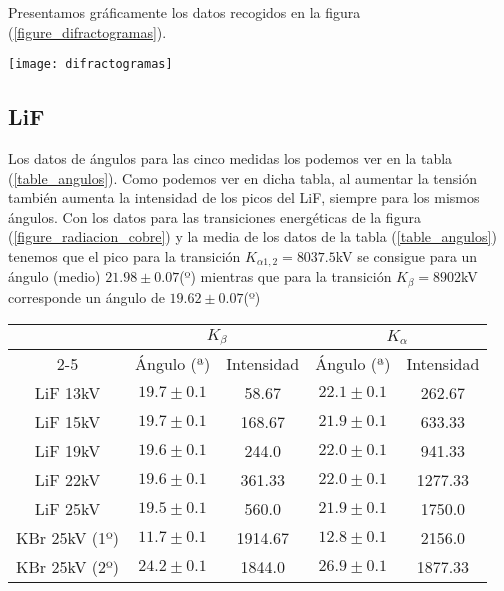 Presentamos gráficamente los datos recogidos en la figura (\ref{figure_difractogramas}).

\begin{figure*}[t]
	\texttt{[image: difractogramas]}
	\caption{Difractogramas de rayos X con energías comprendidas entre 13 y 25 kV}
	\label{figure_difractogramas}
\end{figure*}

\subsection{LiF}

Los datos de ángulos para las cinco medidas los podemos ver en la tabla (\ref{table_angulos}). Como podemos ver en dicha tabla, al aumentar la tensión también aumenta la intensidad de los picos del LiF, siempre para los mismos ángulos. Con los datos para las transiciones energéticas de la figura (\ref{figure_radiacion_cobre}) y la media de los datos de la tabla (\ref{table_angulos}) tenemos que el pico para la transición $K_{\alpha1,2}=8037.5$kV se consigue para un ángulo (medio) $21.98 \pm 0.07$(º) mientras que para la transición $K_{\beta}=8902$kV corresponde un ángulo de $19.62 \pm 0.07$(º)

\begin{table*}[t]
	\centering
	\begin{tabular}{ccccc}
		\toprule
		\multicolumn{1}{c}{} & \multicolumn{2}{c}{$K_{\beta}$} & \multicolumn{2}{c}{$K_{\alpha}$} \\
		\cmidrule(r){2-5}
		& Ángulo (ª)    & Intensidad    & Ángulo (ª) & Intensidad \\
		\midrule
		LiF 13kV & $19.7 \pm 0.1$    & 58.67    & $22.1 \pm 0.1$ & 262.67 \\
		LiF 15kV & $19.7 \pm 0.1$    & 168.67    & $21.9 \pm 0.1$ & 633.33 \\
		LiF 19kV & $19.6 \pm 0.1$    & 244.0    & $22.0 \pm 0.1$ & 941.33 \\
		LiF 22kV & $19.6 \pm 0.1$    & 361.33    & $22.0 \pm 0.1$ & 1277.33 \\
		LiF 25kV & $19.5 \pm 0.1$    & 560.0    & $21.9 \pm 0.1$ & 1750.0 \\
		KBr 25kV (1º) & $11.7 \pm 0.1$    & 1914.67    & $12.8 \pm 0.1$ & 2156.0 \\
		KBr 25kV (2º) & $24.2 \pm 0.1$    & 1844.0    & $26.9 \pm 0.1$ & 1877.33 \\
		\bottomrule
	\end{tabular}
	\caption{Ángulos para los picos $K_{\alpha}$ y $K_{\beta}$}
	\label{table_angulos}
\end{table*}

